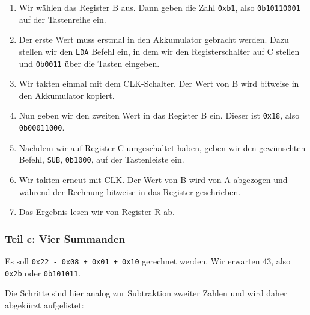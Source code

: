 \begin{enumerate}
	\item
		Wir wählen das Register B aus. Dann geben die Zahl \texttt{0xb1}, also
		\texttt{0b10110001} auf der Tastenreihe ein.

	\item
		Der erste Wert muss erstmal in den Akkumulator gebracht werden. Dazu
		stellen wir den \texttt{LDA} Befehl ein, in dem wir den Registerschalter
		auf C stellen und \texttt{0b0011} über die Tasten eingeben.

	\item
		Wir takten einmal mit dem CLK-Schalter. Der Wert von B wird bitweise in
		den Akkumulator kopiert.

	\item
		Nun geben wir den zweiten Wert in das Register B ein. Dieser ist
		\texttt{0x18}, also \texttt{0b00011000}.

	\item
		Nachdem wir auf Register C umgeschaltet haben, geben wir den
		gewünschten Befehl, \texttt{SUB}, \texttt{0b1000}, auf der Tastenleiste
		ein.

	\item
		Wir takten erneut mit CLK. Der Wert von B wird von A abgezogen und
		während der Rechnung bitweise in das Register geschrieben.

	\item
		Das Ergebnis lesen wir von Register R ab.
\end{enumerate}

\subsubsection{Teil c: Vier Summanden}

Es soll \texttt{0x22 - 0x08 + 0x01 + 0x10} gerechnet werden. Wir erwarten 43,
also \texttt{0x2b} oder \texttt{0b101011}.

Die Schritte sind hier analog zur Subtraktion zweiter Zahlen und wird daher
abgekürzt aufgelistet:

